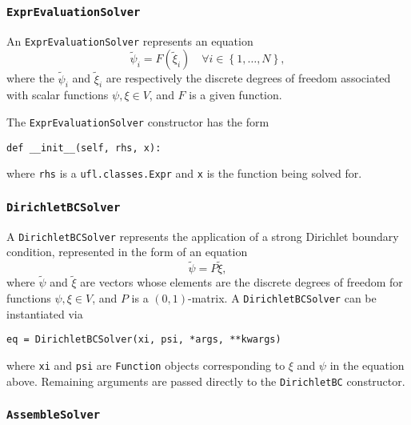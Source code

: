 \documentclass[11pt]{article}
\begin{document}
\subsubsection{\texttt{ExprEvaluationSolver}}

An \texttt{ExprEvaluationSolver} represents an equation
\begin{equation*}
  \tilde{\psi}_i = F \left( \tilde{\xi}_i \right)
    \quad \forall i \in \left\{ 1, \ldots, N \right\},
\end{equation*}
where the $\tilde{\psi}_i$ and $\tilde{\xi}_i$ are respectively the discrete
degrees of freedom associated with scalar functions $\psi, \xi \in V$, and $F$
is a given function.

The \texttt{ExprEvaluationSolver} constructor has the form
\begin{lstlisting}
def __init__(self, rhs, x):
\end{lstlisting}
where \texttt{rhs} is a \texttt{ufl.classes.Expr} and \texttt{x} is the
function being solved for.

\subsubsection{\texttt{DirichletBCSolver}}

A \texttt{DirichletBCSolver} represents the application of a strong Dirichlet
boundary condition, represented in the form of an equation
\begin{equation*}
  \tilde{\psi} = P \tilde{\xi},
\end{equation*}
where $\tilde{\psi}$ and $\tilde{\xi}$ are vectors whose elements are the
discrete degrees of freedom for functions $\psi, \xi \in V$, and $P$ is a
$\left( 0, 1 \right)$-matrix. A \texttt{DirichletBCSolver} can be instantiated
via
\begin{lstlisting}
eq = DirichletBCSolver(xi, psi, *args, **kwargs)
\end{lstlisting}
where \texttt{xi} and \texttt{psi} are \texttt{Function} objects corresponding
to $\xi$ and $\psi$ in the equation above. Remaining arguments are passed
directly to the \texttt{DirichletBC} constructor.

\subsubsection{\texttt{AssembleSolver}}\label{sect:AssembleSolver}
\end{document}
